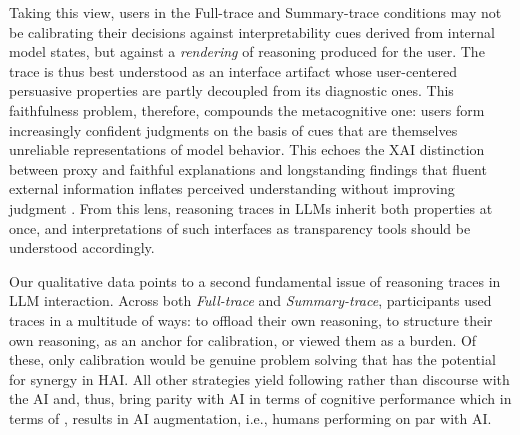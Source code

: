 \documentclass[acmlarge,review=true, anonymous=true]{acmart}
\begin{document}
Taking this view, users in the Full-trace and Summary-trace conditions may not be calibrating their decisions against interpretability cues derived from internal model states, but against a \textit{rendering} of reasoning produced for the user. The trace is thus best understood as an interface artifact \cite{} whose user-centered persuasive properties are partly decoupled from its diagnostic ones. This faithfulness problem, therefore, compounds the metacognitive one: users form increasingly confident judgments on the basis of cues that are themselves unreliable representations of model behavior. This echoes the XAI distinction between proxy and faithful explanations \cite{} and longstanding findings that fluent external information inflates perceived understanding without improving judgment \cite{}. From this lens, reasoning traces in LLMs inherit both properties at once, and interpretations of such interfaces as transparency tools should be understood accordingly.


Our qualitative data points to a second fundamental issue of reasoning traces in LLM interaction. Across both \textit{Full-trace} and \textit{Summary-trace}, participants used traces in a multitude of ways: to offload their own reasoning, to structure their own reasoning, as an anchor for calibration, or viewed them as a burden. Of these, only calibration would be genuine problem solving that has the potential for synergy in HAI. All other strategies yield following rather than discourse with the AI and, thus, bring parity with AI in terms of cognitive performance which in terms of \citet{vaccaro2024combinations}, results in AI augmentation, i.e., humans performing on par with AI. 
\end{document}
